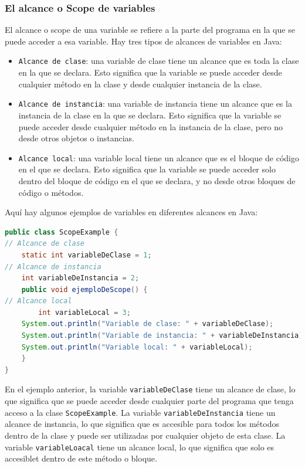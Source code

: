 \documentclass[executivepaper]{article}
\begin{document}
\subsubsection{El alcance o Scope de variables}
El alcance o scope de una variable se refiere a la parte del programa en la que se puede acceder a esa variable. Hay tres tipos de alcances de variables en Java:
\begin{itemize}
    \item \texttt{Alcance de clase}: una variable de clase tiene un alcance que es toda la clase en la que se declara. Esto significa que la variable se puede acceder desde cualquier método en la clase y desde cualquier instancia de la clase.
    \item \texttt{Alcance de instancia}: una variable de instancia tiene un alcance que es la instancia de la clase en la que se declara. Esto significa que la variable se puede acceder desde cualquier método en la instancia de la clase, pero no desde otros objetos o instancias.
    \item \texttt{Alcance local}: una variable local tiene un alcance que es el bloque de código en el que se declara. Esto significa que la variable se puede acceder solo dentro del bloque de código en el que se declara, y no desde otros bloques de código o métodos.
\end{itemize}
Aquí hay algunos ejemplos de variables en diferentes alcances en Java:
\begin{lstlisting}[language=Java]
public class ScopeExample {
// Alcance de clase
    static int variableDeClase = 1;
// Alcance de instancia
    int variableDeInstancia = 2;
    public void ejemploDeScope() {
// Alcance local
        int variableLocal = 3;
    System.out.println("Variable de clase: " + variableDeClase);
    System.out.println("Variable de instancia: " + variableDeInstancia);
    System.out.println("Variable local: " + variableLocal);
    }
}
\end{lstlisting}
En el ejemplo anterior, la variable \texttt{variableDeClase} tiene un alcance de clase, lo que significa que se puede acceder desde cualquier parte del programa que tenga acceso a la clase \texttt{ScopeExample}. La variable \texttt{variableDeInstancia} tiene un alcance de instancia, lo que significa que es accesible para todos los métodos dentro de la clase y puede ser utilizadas por cualquier objeto de esta clase. La variable \texttt{variableLoacal} tiene un alcance local, lo que significa que solo es accesiblet dentro de este método o bloque.
\end{document}
